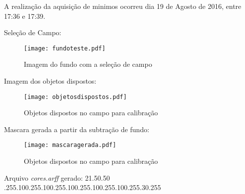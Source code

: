 	
A realização da aquisição de minimos ocorreu dia 19 de Agosto de 2016, entre 17:36 e 17:39.

Seleção de Campo:
\begin{figure}[H]
		\centering
		\texttt{[image: fundoteste.pdf]}
		\caption{Imagem do fundo com a seleção de campo}
		\label{disposicaoparte}
	\end{figure}
	
Imagem dos objetos dispostos:
	\begin{figure}[H]
		\centering
		\texttt{[image: objetosdispostos.pdf]}
		\caption{Objetos dispostos no campo para calibração}
		\label{disposicaoparte}
	\end{figure}
	
Mascara gerada a partir da subtração de fundo:
	\begin{figure}[H]
		\centering
		\texttt{[image: mascaragerada.pdf]}
		\caption{Objetos dispostos no campo para calibração}
		\label{disposicaoparte}
	\end{figure}
	
Arquivo \textit{cores.arff} gerado:
21.50.50 .255.100.255.100.255.100.255.100.255.100.255.30.255\newline

	
